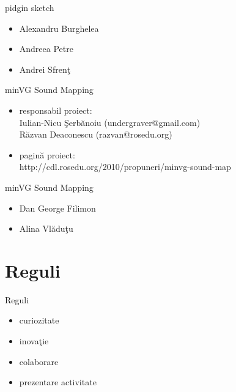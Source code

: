 \documentclass{beamer}
\begin{document}
\begin{frame}{pidgin sketch}
  \begin{itemize} %
  \pause
  \item Alexandru Burghelea
  \pause
  \item Andreea Petre
  \pause
  \item Andrei Sfrenţ
  \end{itemize}
\end{frame}

\begin{frame}{minVG Sound Mapping}
  \begin{itemize} %
  \pause
  \item responsabil proiect: \\ Iulian-Nicu Şerbănoiu (undergraver@gmail.com) \\ Răzvan Deaconescu (razvan@rosedu.org)
  \pause
  \item pagină proiect: \\ http://cdl.rosedu.org/2010/propuneri/minvg-sound-map
  \end{itemize}
\end{frame}

\begin{frame}{minVG Sound Mapping}
  \begin{itemize} %
  \pause
  \item Dan George Filimon
  \pause
  \item Alina Vlăduţu
  \end{itemize}
\end{frame}

\section{Reguli}

\begin{frame}{Reguli}
  \begin{itemize} %
  \pause
  \item curiozitate
  \pause
  \item inovaţie
  \pause
  \item colaborare
  \pause
  \item prezentare activitate
  \end{itemize}
\end{frame}
\end{document}
